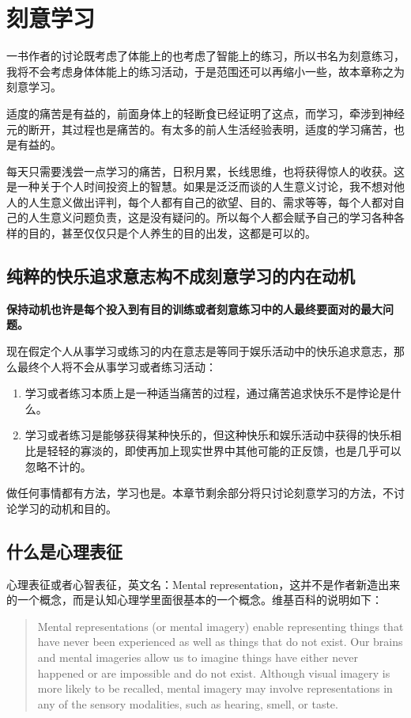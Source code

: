 \documentclass[12pt,oneside]{book}
\begin{document}
\chapter{刻意学习}
\cite{刻意练习} 一书作者的讨论既考虑了体能上的也考虑了智能上的练习，所以书名为刻意练习，我将不会考虑身体体能上的练习活动，于是范围还可以再缩小一些，故本章称之为刻意学习。

适度的痛苦是有益的，前面身体上的轻断食已经证明了这点，而学习，牵涉到神经元的断开，其过程也是痛苦的。有太多的前人生活经验表明，适度的学习痛苦，也是有益的。

每天只需要浅尝一点学习的痛苦，日积月累，长线思维，也将获得惊人的收获。这是一种关于个人时间投资上的智慧。如果是泛泛而谈的人生意义讨论，我不想对他人的人生意义做出评判，每个人都有自己的欲望、目的、需求等等，每个人都对自己的人生意义问题负责，这是没有疑问的。所以每个人都会赋予自己的学习各种各样的目的，甚至仅仅只是个人养生的目的出发，这都是可以的。


\section{纯粹的快乐追求意志构不成刻意学习的内在动机}
\begin{bookref}[frametitle={\cite{刻意练习}}]
\textbf{保持动机也许是每个投入到有目的训练或者刻意练习中的人最终要面对的最大问题。}
\end{bookref}


现在假定个人从事学习或练习的内在意志是等同于娱乐活动中的快乐追求意志，那么最终个人将不会从事学习或者练习活动：

\begin{enumerate}
\item 学习或者练习本质上是一种适当痛苦的过程，通过痛苦追求快乐不是悖论是什么。
\item 学习或者练习是能够获得某种快乐的，但这种快乐和娱乐活动中获得的快乐相比是轻轻的寡淡的，即使再加上现实世界中其他可能的正反馈，也是几乎可以忽略不计的。
\end{enumerate}


做任何事情都有方法，学习也是。本章节剩余部分将只讨论刻意学习的方法，不讨论学习的动机和目的。


\section{什么是心理表征}
心理表征或者心智表征，英文名：Mental representation，这并不是作者新造出来的一个概念，而是认知心理学里面很基本的一个概念。维基百科的说明如下：

\begin{quote}
Mental representations (or mental imagery) enable representing things that have never been experienced as well as things that do not exist. Our brains and mental imageries allow us to imagine things have either never happened or are impossible and do not exist. Although visual imagery is more likely to be recalled, mental imagery may involve representations in any of the sensory modalities, such as hearing, smell, or taste. 
\end{quote}
\end{document}
